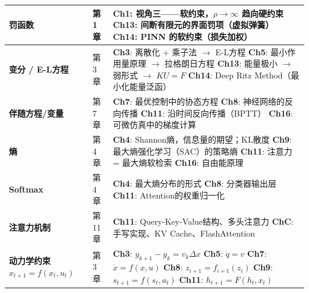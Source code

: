 \begin{center}
\begin{tabular}{@{}p{2.5cm}p{1.9cm}p{7.8cm}@{}}
\textbf{罚函数}
& 第1章
& \textbf{Ch1}: 视角三——软约束，$\rho\to\infty$ 趋向硬约束 \newline
  \textbf{Ch13}: 间断有限元的界面罚项（虚拟弹簧） \newline
  \textbf{Ch14}: PINN 的软约束（损失加权） \\
\midrule

\textbf{变分 / E-L方程}
& 第3章
& \textbf{Ch3}: 离散化 + 乘子法 $\to$ E-L方程 \newline
  \textbf{Ch5}: 最小作用量原理 $\to$ 拉格朗日方程 \newline
  \textbf{Ch13}: 能量极小 $\to$ 弱形式 $\to$ $KU=F$ \newline
  \textbf{Ch14}: Deep Ritz Method（最小化能量泛函） \\
\midrule

\textbf{伴随方程/变量}
& 第7章
& \textbf{Ch7}: 最优控制中的协态方程 \newline
  \textbf{Ch8}: 神经网络的反向传播 \newline
  \textbf{Ch11}: 沿时间反向传播（BPTT） \newline
  \textbf{Ch16}: 可微仿真中的梯度计算 \\
\midrule

\textbf{熵}
& 第4章
& \textbf{Ch4}: Shannon熵，信息量的期望；KL散度 \newline
  \textbf{Ch9}: 最大熵强化学习（SAC）的策略熵 \newline
  \textbf{Ch11}: 注意力 = 最大熵软检索 \newline
  \textbf{Ch16}: 自由能原理 \\
\midrule

\textbf{Softmax}
& 第4章
& \textbf{Ch4}: 最大熵分布的形式 \newline
  \textbf{Ch8}: 分类器输出层 \newline
  \textbf{Ch11}: Attention的权重归一化 \\
\midrule

\textbf{注意力机制}
& 第11章
& \textbf{Ch11}: Query-Key-Value结构、多头注意力 \newline
  \textbf{ChC}: 手写实现、KV Cache、FlashAttention \\
\midrule

\textbf{动力学约束} $x_{t+1}=f(x_t,u_t)$
& 第3章
& \textbf{Ch3}: $y_{k+1}-y_k=v_k\Delta x$ \newline
  \textbf{Ch5}: $\dot q = v$ \newline
  \textbf{Ch7}: $\dot x = f(x,u)$ \newline
  \textbf{Ch8}: $z_{i+1}=f_{i+1}(z_i)$ \newline
  \textbf{Ch9}: $s_{t+1}=f(s_t,a_t)$ \newline
  \textbf{Ch11}: $h_{t+1}=F(h_t,x_t)$ \\
\bottomrule
\end{tabular}
\end{center}

